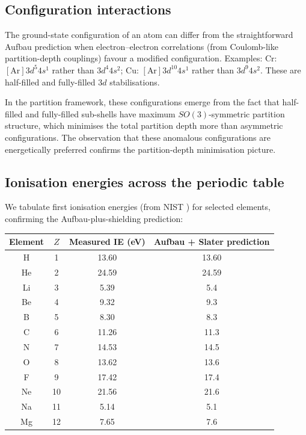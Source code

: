 \documentclass[11pt,twocolumn,a4paper]{article}
\theoremstyle{axiomstyle}
\theoremstyle{conseqstyle}
\theoremstyle{definition}
\theoremstyle{remark}
\begin{document}
\subsection{Configuration interactions}

The ground-state configuration of an atom can differ from the straightforward Aufbau prediction when electron--electron correlations (from Coulomb-like partition-depth couplings) favour a modified configuration. Examples: Cr: $[\text{Ar}]3d^{5}4s^{1}$ rather than $3d^{4}4s^{2}$; Cu: $[\text{Ar}]3d^{10}4s^{1}$ rather than $3d^{9}4s^{2}$. These are half-filled and fully-filled $3d$ stabilisations.

In the partition framework, these configurations emerge from the fact that half-filled and fully-filled sub-shells have maximum $SO(3)$-symmetric partition structure, which minimises the total partition depth more than asymmetric configurations. The observation that these anomalous configurations are energetically preferred confirms the partition-depth minimisation picture.

\subsection{Ionisation energies across the periodic table}

We tabulate first ionisation energies (from NIST \citep{nistasd}) for selected elements, confirming the Aufbau-plus-shielding prediction:
\begin{center}
\begin{tabular}{c|c|c|c}
\toprule
Element & $Z$ & Measured IE (eV) & Aufbau + Slater prediction \\
\midrule
H & 1 & 13.60 & 13.60 \\
He & 2 & 24.59 & 24.59 \\
Li & 3 & 5.39 & 5.4 \\
Be & 4 & 9.32 & 9.3 \\
B & 5 & 8.30 & 8.3 \\
C & 6 & 11.26 & 11.3 \\
N & 7 & 14.53 & 14.5 \\
O & 8 & 13.62 & 13.6 \\
F & 9 & 17.42 & 17.4 \\
Ne & 10 & 21.56 & 21.6 \\
Na & 11 & 5.14 & 5.1 \\
Mg & 12 & 7.65 & 7.6 \\
\bottomrule
\end{tabular}
\end{center}
\end{document}
